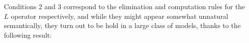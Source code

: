 \begin{comment}
We can therefore get the map $u$ by translating $var_A : \Gamma.A \to \Gamma.A.A^+$ through the isomorphisms:
\[
\mathcal{C}_\Gamma(A, A.^+) \cong \mathcal{T}_{\Gamma.A}(1, \pi  \mathcal{T}_\Gamma(A, M_\Gamma L_\Gamma A) \cong \mathcal{T}_{\Gamma.A}(1, \pi^{(*)\mathcal{T}}_A(M_\Gamma L_\Gamma A)) \cong \mathcal{T}_{\Gamma.A}(1, M_{\Gamma.A}(\pi^{(*)\mathcal{L}}_A L_\Gamma A))) \cong \mathcal{L}_{\Gamma.A}(L(1), \pi^{*(\mathcal{L})}_AL_\Gamma A) \cong \mathcal{L}_{\Gamma.A}(I, \pi^{*(\mathcal{L})}_AL_\Gamma A)
\]
\end{comment}
Conditions 2 and 3 correspond to the elimination and computation rules for the $L$ operator respectively, and while they might appear somewhat unnatural semantically, they turn out to be hold in a large class of models, thanks to the following result:

